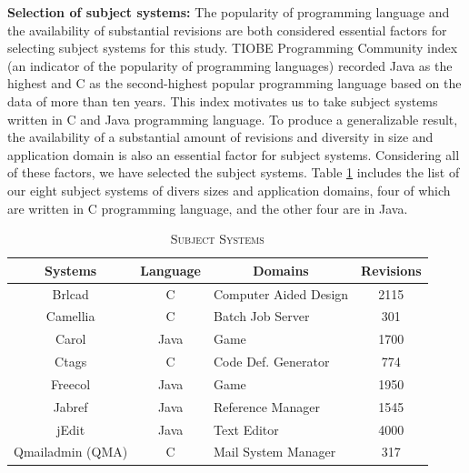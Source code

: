 \documentclass[review]{elsarticle}
\begin{document}
\textbf{Selection of subject systems:} The popularity of programming language and the availability of substantial revisions are both considered essential factors for selecting subject systems for this study. TIOBE Programming Community index \cite{TIOBE2019} (an indicator of the popularity of programming languages) recorded Java as the highest and C as the second-highest popular programming language based on the data of more than ten years. This index motivates us to take subject systems written in C and Java programming language. To produce a generalizable result, the availability of a substantial amount of revisions and diversity in size and application domain is also an essential factor for subject systems. Considering all of these factors, we have selected the subject systems. Table \ref{tab:subject-systems-cc} includes the list of our eight subject systems of divers sizes and application domains, four of which are written in C programming language, and the other four are in Java. 

\begin{table}[htbp] 
\caption{\label{tab:subject-systems-cc}\textsc{Subject Systems}}
\centering
\begin{tabular}{|c|c|l|c|}
\hline
\textbf{Systems} & \textbf{Language} & \multicolumn{1}{c|}{\textbf{Domains}} & \textbf{Revisions} \\ \hline \hline
Brlcad           & C              & Computer Aided Design                 & 2115               \\ \hline
Camellia         & C              & Batch Job Server                      & 301                \\ \hline
Carol            & Java           & Game                                  & 1700               \\ \hline
Ctags            & C              & Code Def. Generator                   & 774                \\ \hline
Freecol          & Java           & Game                                  & 1950               \\ \hline
Jabref           & Java           & Reference Manager                     & 1545               \\ \hline
jEdit            & Java           & Text Editor                           & 4000               \\ \hline
Qmailadmin (QMA)       & C              & Mail System Manager                   & 317                \\ \hline
\end{tabular}
\end{table}
\end{document}
